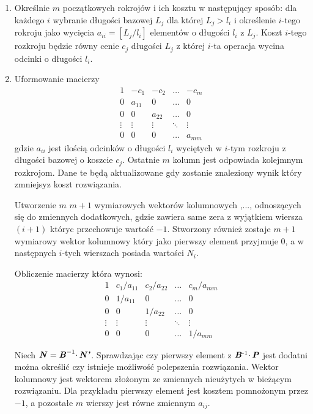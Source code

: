 \begin{enumerate}
\item Określnie $m$ początkowych rokrojów i ich kosztu w następujący sposób: dla każdego $i$ wybranie długości bazowej $L_j$ dla której $L_j > l_i$ i określenie $i$-tego rokroju jako wycięcia $a_{ii} = [L_j / l_i]$ elementów o długości $l_i$ z $L_j$. Koszt $i$-tego rozkroju będzie równy cenie $c_j$ długości $L_j$ z której $i$-ta operacja wycina odcinki o długości $l_i$.
\item Uformowanie macierzy 
\[
\begin{matrix}
1 & -c_1  & -c_2  & \dots & -c_m \\
0 & a_{11}  & 0 & \dots & 0 \\
0 & 0 & a_{22}  & \dots & 0 \\
\vdots&\vdots&\vdots&\ddots&\vdots \\
0 & 0 & 0 & \dots & a_{mm}
\end{matrix}
\]
gdzie $a_{ii}$ jest ilością odcinków o długości $l_i$ wyciętych w $i$-tym rozkroju z długości bazowej o koszcie $c_j$. Ostatnie $m$ kolumn jest odpowiada kolejmnym rozkrojom. Dane te będą aktualizowane gdy zostanie znaleziony wynik który zmniejsyz koszt rozwiązania.

Utworzenie $m$ $m+1$ wymiarowych wektorów kolumnowych ,..., odnoszących się do zmiennych dodatkowych, gdzie  zawiera same zera z wyjątkiem wiersza $(i+1)$ któryc przechowuje wartość $-1$. Stworzony również zostaje $m+1$ wymiarowy wektor kolumnowy  który jako pierwszy element przyjmuje 0, a w następnych $i$-tych wierszach posiada wartości $N_i$.

Obliczenie macierzy  która wynosi:
\[
\begin{matrix}
1 & c_1/a_{11}  & c_2/a_{22}  & \dots & c_m/a_{mm} \\
0 & 1/a_{11}  & 0 & \dots & 0 \\
0 & 0 & 1/a_{22}  & \dots & 0 \\
\vdots&\vdots&\vdots&\ddots&\vdots \\
0 & 0 & 0 & \dots & 1/a_{mm}
\end{matrix}
\]

Niech $\textbf{\textit{N}} = \textbf{\textit{B}}^{-1} \cdotp \textbf{\textit{N'}}$. Sprawdzając czy pierwszy element z $\textbf{\textit{B}}\textsuperscript{-1} \cdotp \textbf{\textit{P}}$ jest dodatni można określić czy istnieje możliwość polepszenia rozwiązania. Wektor kolumnowy  jest wektorem złożonym ze zmiennych nieużytych w bieżącym rozwiązaniu. Dla przykładu pierwszy element jest kosztem pomnożonym przez $-1$, a pozostałe $m$ wierszy jest równe zmiennym $a_{ij}$.


\end{enumerate}
